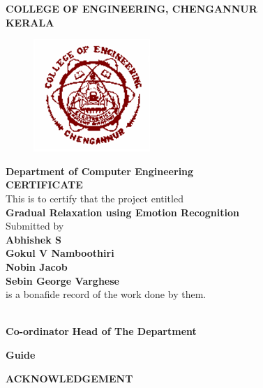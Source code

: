 \documentclass[a4paper,12pt,oneside]{article}
\begin{document}
\newpage
\thispagestyle{empty}
\begin{center}
\setlength{\baselineskip}{1.5\baselineskip}
{\large\textbf{COLLEGE OF ENGINEERING, CHENGANNUR}}
\\
{\large\textbf{KERALA}}
\vspace{2mm}
\begin{figure}[H]
\centering
\includegraphics{ceclogo.png}
\end{figure}
\setlength{\baselineskip}{1.5\baselineskip}
\textbf{Department of Computer Engineering}
\\
\textbf{CERTIFICATE}
\\
This is to certify that the project entitled
\\
\textbf{Gradual Relaxation using Emotion Recognition}
\\
Submitted by
\\
\textbf{Abhishek S}
\\
\textbf{Gokul V Namboothiri}
\\
\textbf{Nobin Jacob}
\\
\textbf{Sebin George Varghese}
\\
is a bonafide record of the work done by them.
\end{center}
\vspace{14ex}
\hspace{55ex}
\\
\vspace{2ex}
\hspace{5ex}
\textbf{
Co-ordinator}
\hspace{40ex}
\textbf{
Head of The Department}
\\
\begin{center}
\textbf{
Guide}
\end{center}




\newpage
{}
\renewcommand{\headrulewidth}{0.0pt}
\renewcommand{\footrulewidth}{0.0pt}
\begin{center}
\large{\textbf{ACKNOWLEDGEMENT}}
\end{center}
\vspace{4ex}
\setlength{\baselineskip}{1.5\baselineskip}
\end{document}
